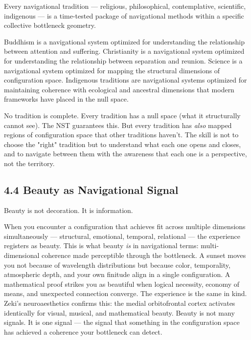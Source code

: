 Every navigational tradition — religious, philosophical, contemplative, scientific, indigenous — is a time-tested package of navigational methods within a specific collective bottleneck geometry.


Buddhism is a navigational system optimized for understanding the relationship between attention and suffering. Christianity is a navigational system optimized for understanding the relationship between separation and reunion. Science is a navigational system optimized for mapping the structural dimensions of configuration space. Indigenous traditions are navigational systems optimized for maintaining coherence with ecological and ancestral dimensions that modern frameworks have placed in the null space.


No tradition is complete. Every tradition has a null space (what it structurally cannot see). The NST guarantees this. But every tradition has \textit{also} mapped regions of configuration space that other traditions haven't. The skill is not to choose the "right" tradition but to understand what each one opens and closes, and to navigate between them with the awareness that each one is a perspective, not the territory.


\subsection*{4.4 Beauty as Navigational Signal}


Beauty is not decoration. It is information.


When you encounter a configuration that achieves fit across multiple dimensions simultaneously — structural, emotional, temporal, relational — the experience registers as beauty. This is what beauty \textit{is} in navigational terms: multi-dimensional coherence made perceptible through the bottleneck. A sunset moves you not because of wavelength distributions but because color, temporality, atmospheric depth, and your own finitude align in a single configuration. A mathematical proof strikes you as beautiful when logical necessity, economy of means, and unexpected connection converge. The experience is the same in kind. Zeki's neuroaesthetics confirms this: the medial orbitofrontal cortex activates identically for visual, musical, and mathematical beauty. Beauty is not many signals. It is one signal — the signal that something in the configuration space has achieved a coherence your bottleneck can detect.


